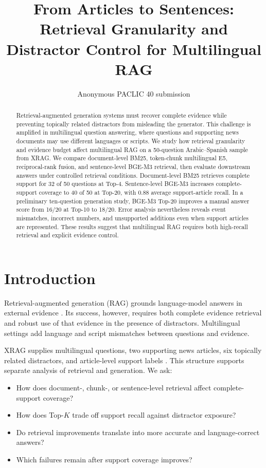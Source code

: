 \documentclass[11pt]{article}
\title{From Articles to Sentences: Retrieval Granularity and Distractor Control for Multilingual RAG}
\author{Anonymous PACLIC 40 submission}
\begin{document}
\maketitle

\begin{abstract}
Retrieval-augmented generation systems must recover complete evidence while preventing topically related distractors from misleading the generator. This challenge is amplified in multilingual question answering, where questions and supporting news documents may use different languages or scripts. We study how retrieval granularity and evidence budget affect multilingual RAG on a 50-question Arabic--Spanish sample from XRAG. We compare document-level BM25, token-chunk multilingual E5, reciprocal-rank fusion, and sentence-level BGE-M3 retrieval, then evaluate downstream answers under controlled retrieval conditions. Document-level BM25 retrieves complete support for 32 of 50 questions at Top-4. Sentence-level BGE-M3 increases complete-support coverage to 40 of 50 at Top-20, with 0.88 average support-article recall. In a preliminary ten-question generation study, BGE-M3 Top-20 improves a manual answer score from 16/20 at Top-10 to 18/20. Error analysis nevertheless reveals event mismatches, incorrect numbers, and unsupported additions even when support articles are represented. These results suggest that multilingual RAG requires both high-recall retrieval and explicit evidence control.
\end{abstract}

\section{Introduction}
Retrieval-augmented generation (RAG) grounds language-model answers in external evidence \citep{lewis2020rag}. Its success, however, requires both complete evidence retrieval and robust use of that evidence in the presence of distractors. Multilingual settings add language and script mismatches between questions and evidence.

XRAG supplies multilingual questions, two supporting news articles, six topically related distractors, and article-level support labels \citep{liu2025xrag}. This structure supports separate analysis of retrieval and generation. We ask:
\begin{itemize}
    \item[RQ1:] How does document-, chunk-, or sentence-level retrieval affect complete-support coverage?
    \item[RQ2:] How does Top-$K$ trade off support recall against distractor exposure?
    \item[RQ3:] Do retrieval improvements translate into more accurate and language-correct answers?
    \item[RQ4:] Which failures remain after support coverage improves?
\end{itemize}
\end{document}
